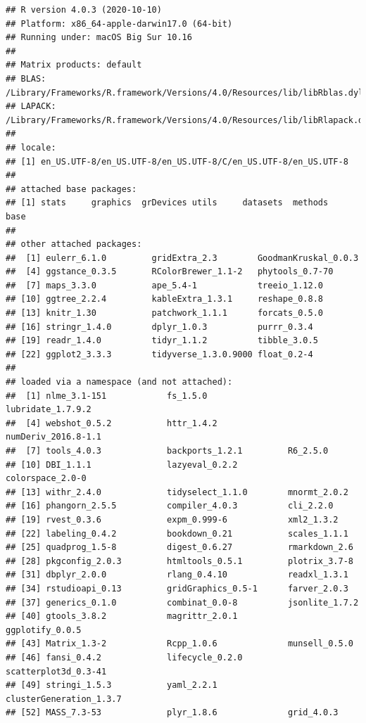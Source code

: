 \documentclass[
  11pt,
]{article}
\begin{document}
\begin{verbatim}
## R version 4.0.3 (2020-10-10)
## Platform: x86_64-apple-darwin17.0 (64-bit)
## Running under: macOS Big Sur 10.16
## 
## Matrix products: default
## BLAS:   /Library/Frameworks/R.framework/Versions/4.0/Resources/lib/libRblas.dylib
## LAPACK: /Library/Frameworks/R.framework/Versions/4.0/Resources/lib/libRlapack.dylib
## 
## locale:
## [1] en_US.UTF-8/en_US.UTF-8/en_US.UTF-8/C/en_US.UTF-8/en_US.UTF-8
## 
## attached base packages:
## [1] stats     graphics  grDevices utils     datasets  methods   base     
## 
## other attached packages:
##  [1] eulerr_6.1.0         gridExtra_2.3        GoodmanKruskal_0.0.3
##  [4] ggstance_0.3.5       RColorBrewer_1.1-2   phytools_0.7-70     
##  [7] maps_3.3.0           ape_5.4-1            treeio_1.12.0       
## [10] ggtree_2.2.4         kableExtra_1.3.1     reshape_0.8.8       
## [13] knitr_1.30           patchwork_1.1.1      forcats_0.5.0       
## [16] stringr_1.4.0        dplyr_1.0.3          purrr_0.3.4         
## [19] readr_1.4.0          tidyr_1.1.2          tibble_3.0.5        
## [22] ggplot2_3.3.3        tidyverse_1.3.0.9000 float_0.2-4         
## 
## loaded via a namespace (and not attached):
##  [1] nlme_3.1-151            fs_1.5.0                lubridate_1.7.9.2      
##  [4] webshot_0.5.2           httr_1.4.2              numDeriv_2016.8-1.1    
##  [7] tools_4.0.3             backports_1.2.1         R6_2.5.0               
## [10] DBI_1.1.1               lazyeval_0.2.2          colorspace_2.0-0       
## [13] withr_2.4.0             tidyselect_1.1.0        mnormt_2.0.2           
## [16] phangorn_2.5.5          compiler_4.0.3          cli_2.2.0              
## [19] rvest_0.3.6             expm_0.999-6            xml2_1.3.2             
## [22] labeling_0.4.2          bookdown_0.21           scales_1.1.1           
## [25] quadprog_1.5-8          digest_0.6.27           rmarkdown_2.6          
## [28] pkgconfig_2.0.3         htmltools_0.5.1         plotrix_3.7-8          
## [31] dbplyr_2.0.0            rlang_0.4.10            readxl_1.3.1           
## [34] rstudioapi_0.13         gridGraphics_0.5-1      farver_2.0.3           
## [37] generics_0.1.0          combinat_0.0-8          jsonlite_1.7.2         
## [40] gtools_3.8.2            magrittr_2.0.1          ggplotify_0.0.5        
## [43] Matrix_1.3-2            Rcpp_1.0.6              munsell_0.5.0          
## [46] fansi_0.4.2             lifecycle_0.2.0         scatterplot3d_0.3-41   
## [49] stringi_1.5.3           yaml_2.2.1              clusterGeneration_1.3.7
## [52] MASS_7.3-53             plyr_1.8.6              grid_4.0.3             

\end{verbatim}
\end{document}

